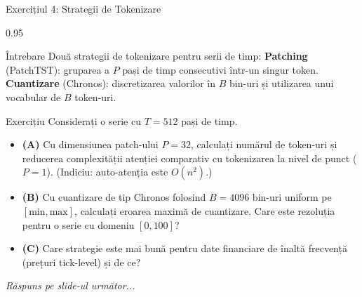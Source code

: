 \documentclass[9pt, aspectratio=169, t]{beamer}
\begin{document}
\begin{frame}{Exercițiul 4: Strategii de Tokenizare}
    \begin{cminipage}{0.95\textwidth}
    {\small
    \begin{alertblock}{Întrebare}
        Două strategii de tokenizare pentru serii de timp:
        \textbf{Patching} (PatchTST): gruparea a $P$ pași de timp consecutivi într-un singur token.
        \textbf{Cuantizare} (Chronos): discretizarea valorilor în $B$ bin-uri și utilizarea unui vocabular de $B$ token-uri.
    \end{alertblock}

    \vspace{0.1cm}

    \begin{block}{Exercițiu}
        Considerați o serie cu $T = 512$ pași de timp.
        \begin{itemize}\setlength{\itemsep}{3pt}
            \item \textcolor{MainBlue}{\textbf{(A)}} Cu dimensiunea patch-ului $P = 32$, calculați numărul de token-uri și reducerea complexității atenției comparativ cu tokenizarea la nivel de punct ($P=1$). (Indiciu: auto-atenția este $O(n^2)$.)
            \item \textcolor{MainBlue}{\textbf{(B)}} Cu cuantizare de tip Chronos folosind $B = 4096$ bin-uri uniform pe $[\text{min}, \text{max}]$, calculați eroarea maximă de cuantizare. Care este rezoluția pentru o serie cu domeniu $[0, 100]$?
            \item \textcolor{MainBlue}{\textbf{(C)}} Care strategie este mai bună pentru date financiare de înaltă frecvență (prețuri tick-level) și de ce?
        \end{itemize}
    \end{block}

    \vspace{0.1cm}

    \begin{center}
        \textit{Răspuns pe slide-ul următor...}
    \end{center}
    }
    \end{cminipage}
\end{frame}
\end{document}
